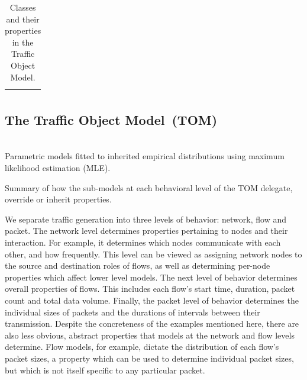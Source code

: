 \documentclass[conference]{IEEEtran}
\newcommand{\caps}[1]{{\small{#1}}}
\begin{document}
\begin{table}[t]
\vspace{0.75em}
\begin{center}
\begin{tabular}[t]{|l|}
\hline
\begin{minipage}[l]{2.8in}
\begin{small}
\vspace{0.6em}

\vspace{0.6em}
\end{small}
\end{minipage}
\\\hline
\end{tabular}
\end{center}
\vspace{-0.5em}
\caption{Classes and their properties in the Traffic Object Model.}
\vspace{-2em}
\end{table}

\subsection{The Traffic Object Model~(\caps{TOM})}\label{sec:models}

\begin{table}[t]
\begin{center}
\small

\footnotesize\\[0.5em]
\raisebox{1pt}{*}Parametric models fitted to inherited empirical distributions using maximum likelihood estimation ({\scriptsize{MLE}}).
\end{center}
\vspace{-0.75em}
\caption{Summary of how the sub-models at each behavioral level of the {\footnotesize{TOM}} delegate, override or inherit properties.}
\vspace{-1.75em}
\end{table}

We separate traffic generation into three levels of behavior: network, flow and packet. The {network} level determines properties pertaining to nodes and their interaction. For example, it determines which nodes communicate with each other, and how frequently. This level can be viewed as assigning network nodes to the source and destination roles of flows, as well as determining per-node properties which affect lower level models. The next level of behavior determines overall properties of flows. This includes each flow's start time, duration, packet count and total data volume. Finally, the packet level of behavior determines the individual sizes of packets and the durations of intervals between their transmission. Despite the concreteness of the examples mentioned here, there are also less obvious, abstract properties that models at the network and flow levels determine. Flow models, for example, dictate the distribution of each flow's packet sizes, a property which can be used to determine individual packet sizes, but which is not itself specific to any particular packet.
\end{document}
